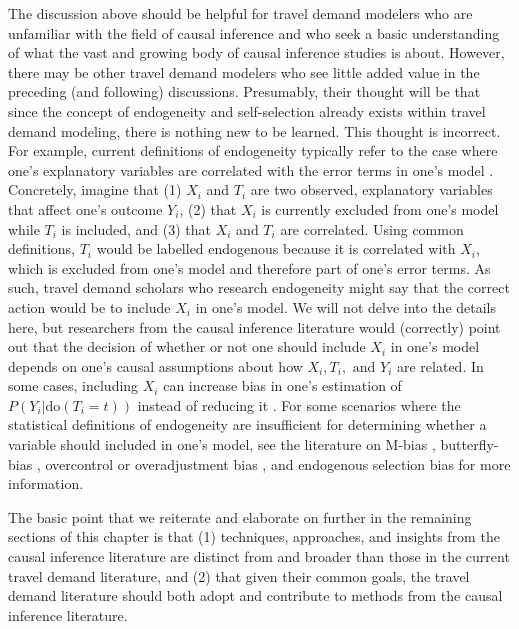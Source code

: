 The discussion above should be helpful for travel demand modelers who are unfamiliar with the field of causal inference and who seek a basic understanding of what the vast and growing body of causal inference studies is about. However, there may be other travel demand modelers who see little added value in the preceding (and following) discussions. Presumably, their thought will be that since the concept of endogeneity and self-selection already exists within travel demand modeling, there is nothing new to be learned. This thought is incorrect. For example, current definitions of endogeneity typically refer to the case where one's explanatory variables are correlated with the error terms in one's model \citep{louviere_2005_recent}. Concretely, imagine that (1) $X_i$ and $T_i$ are two observed, explanatory variables that affect one's outcome $Y_i$, (2) that $X_i$ is currently excluded from one's model while $T_i$ is included, and (3) that $X_i$ and $T_i$ are correlated. Using common definitions, $T_i$ would be labelled endogenous because it is correlated with $X_i$, which is excluded from one's model and therefore part of one's error terms. As such, travel demand scholars who research endogeneity might say that the correct action would be to include $X_i$ in one's model. We will not delve into the details here, but researchers from the causal inference literature would (correctly) point out that the decision of whether or not one should include $X_i$ in one's model depends on one's causal assumptions about how $X_i, T_i,\textrm{ and } Y_i$ are related. In some cases, including $X_i$ can increase bias in one's estimation of $P \left( Y_i | \textrm{do} \left(T_i = t \right) \right)$ instead of reducing it \citep{elwert_2013_graphical, ding_2015_adjust}. For some scenarios where the statistical definitions of endogeneity are insufficient for determining whether a variable should included in one's model, see the literature on M-bias \citep{ding_2015_adjust}, butterfly-bias \citep{ding_2015_adjust}, overcontrol or overadjustment bias \citep{schisterman_2009_overadjustment, elwert_2014_endogenous}, and endogenous selection bias \citep{elwert_2014_endogenous} for more information. 

The basic point that we reiterate and elaborate on further in the remaining sections of this chapter is that (1) techniques, approaches, and insights from the causal inference literature are distinct from and broader than those in the current travel demand literature, and (2) that given their common goals, the travel demand literature should both adopt and contribute to methods from the causal inference literature.


